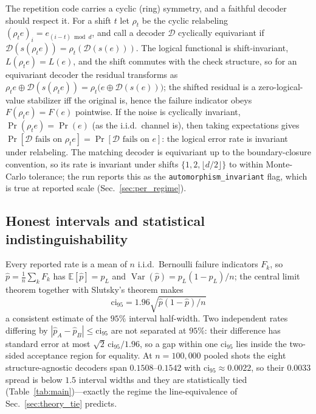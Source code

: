 \documentclass[reprint,aps,prxquantum,amsmath,amssymb,floatfix,nofootinbib,longbibliography]{revtex4-2}
\theoremstyle{definition}
\theoremstyle{remark}
\theoremstyle{plain}
\newcommand{\calD}{\mathcal{D}}
\newcommand{\abs}[1]{\left\lvert #1 \right\rvert}
\newcommand{\sync}[1]{#1}
\begin{document}
The repetition code carries a cyclic (ring) symmetry, and a faithful decoder should respect it. For a shift $t$ let $\rho_t$ be the cyclic relabeling $(\rho_t e)_i=e_{(i-t)\bmod d}$, and call a decoder $\calD$ cyclically equivariant if $\calD(s(\rho_t e))=\rho_t(\calD(s(e)))$. The logical functional is shift-invariant, $L(\rho_t e)=L(e)$, and the shift commutes with the check structure, so for an equivariant decoder the residual transforms as $\rho_t e\oplus\calD(s(\rho_t e))=\rho_t\bigl(e\oplus\calD(s(e))\bigr)$; the shifted residual is a zero-logical-value stabilizer iff the original is, hence the failure indicator obeys $F(\rho_t e)=F(e)$ pointwise. If the noise is cyclically invariant, $\Pr(\rho_t e)=\Pr(e)$ (as the i.i.d.\ channel is), then taking expectations gives $\Pr[\calD\text{ fails on }\rho_t e]=\Pr[\calD\text{ fails on }e]$: the logical error rate is invariant under relabeling. The matching decoder is equivariant up to the boundary-closure convention, so its rate is invariant under shifts $\{1,2,\lfloor d/2\rfloor\}$ to within Monte-Carlo tolerance; the run reports this as the \texttt{automorphism\_invariant} flag, which is \sync{true} at reported scale (Sec.~\ref{sec:per_regime}).

\subsection{Honest intervals and statistical indistinguishability}
\label{sec:theory_ci}

Every reported rate is a mean of $n$ i.i.d.\ Bernoulli failure indicators $F_k$, so $\hat p=\frac1n\sum_k F_k$ has $\mathbb E[\hat p]=p_L$ and $\operatorname{Var}(\hat p)=p_L(1-p_L)/n$; the central limit theorem together with Slutsky's theorem makes
\begin{equation}
  \mathrm{ci}_{95}=1.96\sqrt{\hat p(1-\hat p)/n}
  \label{eq:ci}
\end{equation}
a consistent estimate of the $95\%$ interval half-width. Two independent rates differing by $\abs{\hat p_A-\hat p_B}\le\mathrm{ci}_{95}$ are not separated at $95\%$: their difference has standard error at most $\sqrt 2\,\mathrm{ci}_{95}/1.96$, so a gap within one $\mathrm{ci}_{95}$ lies inside the two-sided acceptance region for equality. At $n=\sync{100{,}000}$ pooled shots the eight structure-agnostic decoders span $\sync{0.1508}$--$\sync{0.1542}$ with $\mathrm{ci}_{95}\approx\sync{0.0022}$, so their $\sync{0.0033}$ spread is below $1.5$ interval widths and they are statistically tied (Table~\ref{tab:main})---exactly the regime the line-equivalence of Sec.~\ref{sec:theory_tie} predicts.
\end{document}
